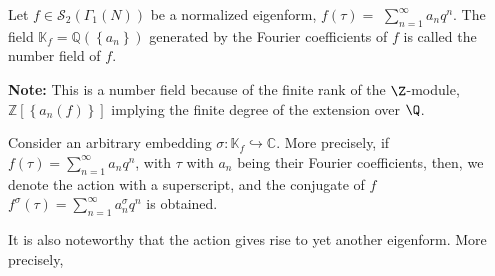 \begin{definition}
    Let $f \in \mathcal{S}_{2}\left(\Gamma_{1}(N)\right)$ be a normalized eigenform, $f(\tau)=$ $\sum_{n=1}^{\infty} a_{n} q^{n}$. The field $\mathbb{K}_{f}=\mathbb{Q}\left(\left\{a_{n}\right\}\right)$ generated by the Fourier coefficients of $f$ is called the number field of $f$.
\end{definition}

\textbf{Note:}
This is a number field because of the finite rank of the $\Z$-module, $\mathbb{Z}\left[\left\{a_{n}(f)\right\}\right]$ implying the finite degree of the extension over $\Q$. 

Consider an arbitrary embedding \(\sigma: \mathbb{K}_{f} \hookrightarrow \mathbb{C}\). More precisely, if \(f(\tau)=\sum_{n=1}^{\infty} a_{n} q^{n}\), with \(\tau\) with \(a_{n}\) being their Fourier coefficients, then, we denote the action with a superscript, and the conjugate of $f$ \(f^{\sigma}(\tau)=\sum_{n=1}^{\infty} a_{n}^{\sigma} q^{n}\) is obtained.

It is also noteworthy that the action gives rise to yet another eigenform.
More precisely,

